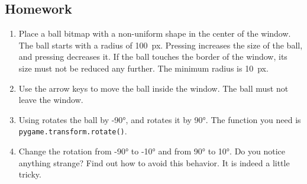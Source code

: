 \subsection{Homework}
\begin{enumerate}
	\item Place a ball bitmap with a non-uniform shape in the center of the window. The ball starts with a radius of \SI{100}{px}.	Pressing \keys{{+}} increases the size of the ball, and pressing \keys{-} decreases it. If the ball touches the border of the window, its size must not be	reduced any further. The minimum radius is \SI{10}{px}.
	
	\item Use the arrow keys to move the ball inside the window. The ball must not leave the window.
	
	\item Using \keys{\shift + \arrowkeyleft} rotates the ball by \ang{-90}, and \keys{\shift + \arrowkeyright} rotates it by \ang{90}.
	The function you need is \texttt{pygame.transform.rotate()}.
	
	\item Change the rotation from \ang{-90} to \ang{-10} and from \ang{90} to \ang{10}. Do you notice anything strange? Find out how to avoid this behavior. It is indeed a little tricky.
\end{enumerate}


